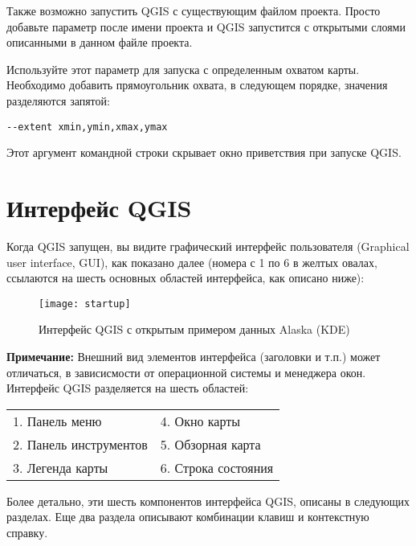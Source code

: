 Также возможно запустить QGIS с существующим файлом проекта. Просто добавьте параметр
 после имени проекта и QGIS запустится с открытыми слоями описанными в данном
файле проекта.

Используйте этот параметр для запуска с определенным охватом карты. Необходимо добавить прямоугольник
охвата, в следующем порядке, значения разделяются запятой:
\begin{verbatim}
--extent xmin,ymin,xmax,ymax
\end{verbatim}

Этот аргумент командной строки скрывает окно приветствия при запуске QGIS.

\section{Интерфейс QGIS}
\label{label_qgismainwindow}

Когда QGIS запущен, вы видите графический интерфейс пользователя (Graphical user interface, GUI),
как показано далее (номера с 1 по 6 в желтых овалах, ссылаются на шесть основных областей
интерфейса, как описано ниже):

\begin{figure}[ht]
   \centering
    \texttt{[image: startup]}
    \caption{Интерфейс QGIS с открытым примером данных Alaska \nixcaption (KDE)} \label{fig:startup}
\end{figure}

\textbf{Примечание:} Внешний вид элементов интерфейса (заголовки и т.п.) может отличаться, в
зависисмости от операционной системы и менеджера окон.\\

Интерфейс QGIS разделяется на шесть областей:

\begin{tabular}{p{5cm} p{5cm}}
1. Панель меню & 4. Окно карты \\
2. Панель инструментов & 5. Обзорная карта \\
3. Легенда карты & 6. Строка состояния \\
\end{tabular}

Более детально, эти шесть компонентов интерфейса QGIS, описаны в следующих разделах. Еще два раздела
описывают комбинации клавиш и контекстную справку.

